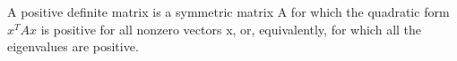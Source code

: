 A positive definite matrix is a symmetric matrix A for which the quadratic form $x^{T}Ax$  is positive for all nonzero vectors x, or, equivalently,
for which all the eigenvalues are positive.